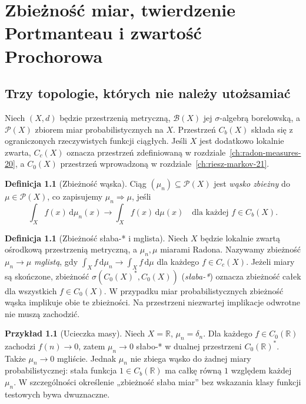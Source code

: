 \documentclass[11pt,a4paper,oneside]{book}
\numberwithin{equation}{chapter}
\theoremstyle{plain}
\theoremstyle{definition}
\newtheorem{definicja}[twierdzenie]{Definicja}
\newtheorem{przyklad}[twierdzenie]{Przykład}
\theoremstyle{remark}
\begin{document}


\chapter[Zbieżność miar i twierdzenie Prochorowa]{Zbieżność miar, twierdzenie Portmanteau i zwartość Prochorowa}
\label{ch:weak-measures-22}

\section{Trzy topologie, których nie należy utożsamiać}
Niech $(X,d)$ będzie przestrzenią metryczną,
$\mathcal B(X)$ jej $\sigma$-algebrą borelowską,
a $\mathcal P(X)$ zbiorem miar probabilistycznych na $X$.
Przestrzeń $C_b(X)$ składa się z ograniczonych rzeczywistych
funkcji ciągłych. Jeśli $X$ jest dodatkowo lokalnie zwarta,
$C_c(X)$ oznacza przestrzeń zdefiniowaną w
rozdziale~\ref{ch:radon-measures-20}, a $C_0(X)$
przestrzeń wprowadzoną w rozdziale~\ref{ch:riesz-markov-21}.

\begin{definicja}[Zbieżność wąska]
\label{def:narrow-measures-22}
Ciąg $(\mu_n)\subseteq\mathcal P(X)$ jest
\emph{wąsko zbieżny} do $\mu\in\mathcal P(X)$,
co zapisujemy $\mu_n\Rightarrow\mu$, jeśli
\begin{equation}\label{eq:narrow-22}
 \int_X f(x)\,\mathrm d\mu_n(x)
 \longrightarrow\int_X f(x)\,\mathrm d\mu(x)
 \quad\text{dla każdej }f\in C_b(X).
\end{equation}
\end{definicja}

\begin{definicja}[Zbieżność słaba-* i mglista]
\label{def:vague-weakstar-22}
Niech $X$ będzie lokalnie zwartą ośrodkową przestrzenią
metryczną, a $\mu_n,\mu$ miarami Radona.
Nazywamy zbieżność $\mu_n\to\mu$ \emph{mglistą},
gdy $\int_Xf\,\mathrm d\mu_n\to\int_Xf\,\mathrm d\mu$
dla każdego $f\in C_c(X)$.
Jeżeli miary są skończone, zbieżność
$\sigma(C_0(X)^*,C_0(X))$ (\emph{słaba-*})
oznacza zbieżność całek dla wszystkich $f\in C_0(X)$.
W przypadku miar probabilistycznych zbieżność wąska
implikuje obie te zbieżności. Na przestrzeni niezwartej
implikacje odwrotne nie muszą zachodzić.
\end{definicja}

\begin{przyklad}[Ucieczka masy]
\label{ex:mass-escape-22}
Niech $X=\mathbb R$, $\mu_n=\delta_n$.
Dla każdego $f\in C_0(\mathbb R)$ zachodzi $f(n)\to0$,
zatem $\mu_n\to0$ słabo-* w dualnej przestrzeni
$C_0(\mathbb R)^*$. Także $\mu_n\to0$ mgliście.
Jednak $\mu_n$ nie zbiega wąsko do żadnej miary
probabilistycznej: stała funkcja $1\in C_b(\mathbb R)$
ma całkę równą $1$ względem każdej $\mu_n$.
W szczególności określenie „zbieżność słaba miar” bez
wskazania klasy funkcji testowych bywa dwuznaczne.
\end{przyklad}
\end{document}

